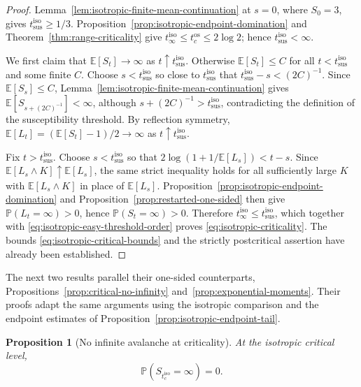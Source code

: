 \documentclass[11pt,a4paper]{amsart}
\newtheorem{proposition}[theorem]{Proposition}
\theoremstyle{remark}
\begin{document}
\begin{proof}
Lemma~\ref{lem:isotropic-finite-mean-continuation} at $s=0$, where
$S_0=3$, gives $t_{\mathrm{sus}}^{\mathrm{iso}}\geq1/3$.
Proposition~\ref{prop:isotropic-endpoint-domination} and
Theorem~\ref{thm:range-criticality} give
$t_{\infty}^{\mathrm{iso}}\leq t_c^{\mathrm{os}}\leq2\log2$; hence
$t_{\mathrm{sus}}^{\mathrm{iso}}<\infty$.

We first claim that $\mathbb{E}[S_t]\to\infty$ as
$t\uparrow t_{\mathrm{sus}}^{\mathrm{iso}}$. Otherwise
$\mathbb{E}[S_t]\leq C$ for all $t<t_{\mathrm{sus}}^{\mathrm{iso}}$ and some
finite $C$. Choose $s<t_{\mathrm{sus}}^{\mathrm{iso}}$ so close to
$t_{\mathrm{sus}}^{\mathrm{iso}}$ that
$t_{\mathrm{sus}}^{\mathrm{iso}}-s<(2C)^{-1}$. Since
$\mathbb{E}[S_s]\leq C$, Lemma~\ref{lem:isotropic-finite-mean-continuation}
gives $\mathbb{E}[S_{s+(2C)^{-1}}]<\infty$, although
$s+(2C)^{-1}>t_{\mathrm{sus}}^{\mathrm{iso}}$, contradicting the definition
of the susceptibility threshold. By reflection symmetry,
$\mathbb{E}[L_t]=(\mathbb{E}[S_t]-1)/2\to\infty$ as
$t\uparrow t_{\mathrm{sus}}^{\mathrm{iso}}$.

Fix $t>t_{\mathrm{sus}}^{\mathrm{iso}}$. Choose
$s<t_{\mathrm{sus}}^{\mathrm{iso}}$ so that
$2\log(1+1/\mathbb{E}[L_s])<t-s$. Since
$\mathbb{E}[L_s\wedge K]\uparrow\mathbb{E}[L_s]$, the same strict inequality
holds for all sufficiently large $K$ with $\mathbb{E}[L_s\wedge K]$ in
place of $\mathbb{E}[L_s]$. Proposition~\ref{prop:isotropic-endpoint-domination}
and Proposition~\ref{prop:restarted-one-sided} then give
$\mathbb{P}(L_t=\infty)>0$, hence $\mathbb{P}(S_t=\infty)>0$. Therefore
$t_{\infty}^{\mathrm{iso}}\leq t_{\mathrm{sus}}^{\mathrm{iso}}$, which
together with \eqref{eq:isotropic-easy-threshold-order} proves
\eqref{eq:isotropic-criticality}. The bounds
\eqref{eq:isotropic-critical-bounds} and the strictly postcritical assertion
have already been established.
\end{proof}



The next two results parallel their one-sided counterparts,
Propositions~\ref{prop:critical-no-infinity}
and~\ref{prop:exponential-moments}. Their proofs adapt the same
arguments using the isotropic comparison and the endpoint estimates of
Proposition~\ref{prop:isotropic-endpoint-tail}.


\begin{proposition}[No infinite avalanche at criticality]
\label{prop:isotropic-critical-finiteness}
At the isotropic critical level,
\[
        \mathbb{P}(S_{t_c^{\mathrm{iso}}}=\infty)=0.
\]
\end{proposition}
\end{document}
